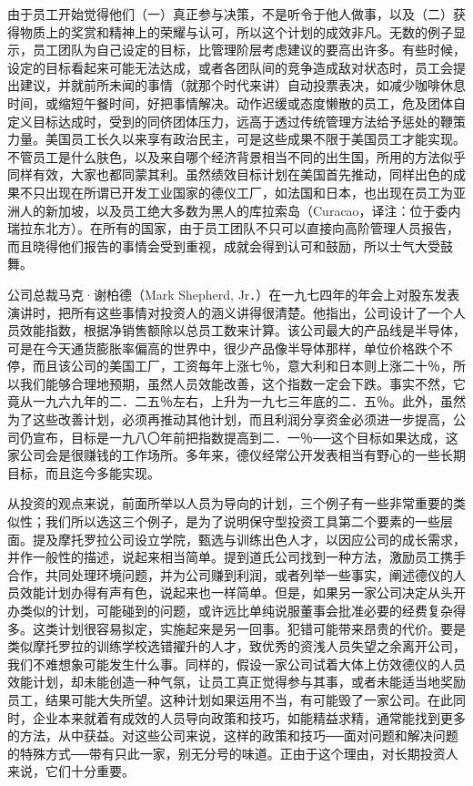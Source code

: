 \documentclass[UTF8,a4paper,zihao=-4,fontset = windows]{ctexart} %
\begin{document}
由于员工开始觉得他们（一）真正参与决策，不是听令于他人做事，以及（二）获得物质上的奖赏和精神上的荣耀与认可，所以这个计划的成效非凡。无数的例子显示，员工团队为自己设定的目标，比管理阶层考虑建议的要高出许多。有些时候，设定的目标看起来可能无法达成，或者各团队间的竞争造成敌对状态时，员工会提出建议，并就前所未闻的事情（就那个时代来讲）自动投票表决，如减少咖啡休息时间，或缩短午餐时间，好把事情解决。动作迟缓或态度懒散的员工，危及团体自定义目标达成时，受到的同侪团体压力，远高于透过传统管理方法给予惩处的鞭策力量。美国员工长久以来享有政治民主，可是这些成果不限于美国员工才能实现。不管员工是什么肤色，以及来自哪个经济背景相当不同的出生国，所用的方法似乎同样有效，大家也都同蒙其利。虽然绩效目标计划在美国首先推动，同样出色的成果不只出现在所谓已开发工业国家的德仪工厂，如法国和日本，也出现在员工为亚洲人的新加坡，以及员工绝大多数为黑人的库拉索岛（Curacao，译注：位于委内瑞拉东北方）。在所有的国家，由于员工团队不只可以直接向高阶管理人员报告，而且晓得他们报告的事情会受到重视，成就会得到认可和鼓励，所以士气大受鼓舞。

公司总裁马克·谢柏德（Mark Shepherd, Jr．）在一九七四年的年会上对股东发表演讲时，把所有这些事情对投资人的涵义讲得很清楚。他指出，公司设计了一个人员效能指数，根据净销售额除以总员工数来计算。该公司最大的产品线是半导体，可是在今天通货膨胀率偏高的世界中，很少产品像半导体那样，单位价格跌个不停，而且该公司的美国工厂，工资每年上涨七％，意大利和日本则上涨二十％，所以我们能够合理地预期，虽然人员效能改善，这个指数一定会下跌。事实不然，它竟从一九六九年的二．二五％左右，上升为一九七三年底的二．五％。此外，虽然为了这些改善计划，必须再推动其他计划，而且利润分享资金必须进一步提高，公司仍宣布，目标是一九八〇年前把指数提高到二．一％──这个目标如果达成，这家公司会是很赚钱的工作场所。多年来，德仪经常公开发表相当有野心的一些长期目标，而且迄今多能实现。

从投资的观点来说，前面所举以人员为导向的计划，三个例子有一些非常重要的类似性；我们所以选这三个例子，是为了说明保守型投资工具第二个要素的一些层面。提及摩托罗拉公司设立学院，甄选与训练出色人才，以因应公司的成长需求，并作一般性的描述，说起来相当简单。提到道氏公司找到一种方法，激励员工携手合作，共同处理环境问题，并为公司赚到利润，或者列举一些事实，阐述德仪的人员效能计划办得有声有色，说起来也一样简单。但是，如果另一家公司决定从头开办类似的计划，可能碰到的问题，或许远比单纯说服董事会批准必要的经费复杂得多。这类计划很容易拟定，实施起来是另一回事。犯错可能带来昂贵的代价。要是类似摩托罗拉的训练学校选错擢升的人才，致优秀的资浅人员失望之余离开公司，我们不难想象可能发生什么事。同样的，假设一家公司试着大体上仿效德仪的人员效能计划，却未能创造一种气氛，让员工真正觉得参与其事，或者未能适当地奖励员工，结果可能大失所望。这种计划如果运用不当，有可能毁了一家公司。在此同时，企业本来就着有成效的人员导向政策和技巧，如能精益求精，通常能找到更多的方法，从中获益。对这些公司来说，这样的政策和技巧──面对问题和解决问题的特殊方式──带有只此一家，别无分号的味道。正由于这个理由，对长期投资人来说，它们十分重要。
\\
\end{document}
